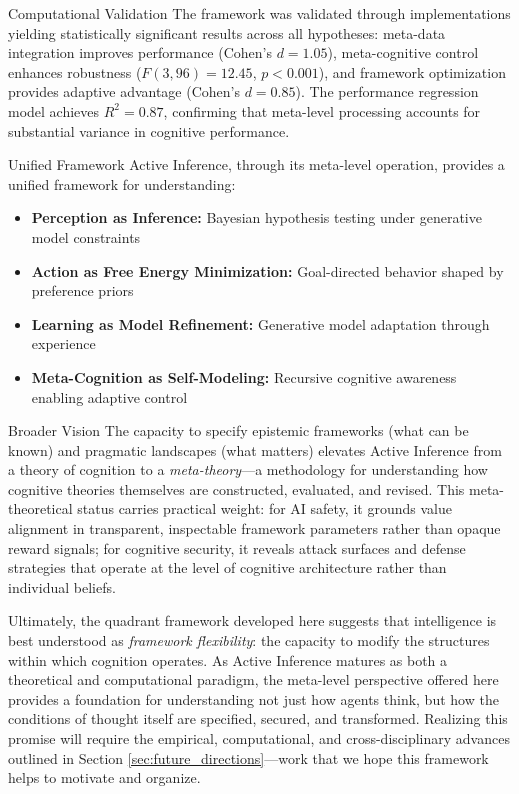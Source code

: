 \documentclass[
  ignorenonframetext,
]{beamer}
\providecommand{\tightlist}{%
  \setlength{\itemsep}{0pt}\setlength{\parskip}{0pt}}
\begin{document}
\begin{frame}{Computational Validation}
\protect{}\label{computational-validation}
The framework was validated through implementations yielding
statistically significant results across all hypotheses: meta-data
integration improves performance (Cohen's \(d = 1.05\)), meta-cognitive
control enhances robustness (\(F(3,96) = 12.45\), \(p < 0.001\)), and
framework optimization provides adaptive advantage (Cohen's
\(d = 0.85\)). The performance regression model achieves \(R^2 = 0.87\),
confirming that meta-level processing accounts for substantial variance
in cognitive performance.
\end{frame}

\begin{frame}{Unified Framework}
\protect{}\label{unified-framework}
Active Inference, through its meta-level operation, provides a unified
framework for understanding:

\begin{itemize}
\tightlist
\item
  \textbf{Perception as Inference:} Bayesian hypothesis testing under
  generative model constraints
\item
  \textbf{Action as Free Energy Minimization:} Goal-directed behavior
  shaped by preference priors
\item
  \textbf{Learning as Model Refinement:} Generative model adaptation
  through experience
\item
  \textbf{Meta-Cognition as Self-Modeling:} Recursive cognitive
  awareness enabling adaptive control
\end{itemize}
\end{frame}

\begin{frame}{Broader Vision}
\protect{}\label{broader-vision}
The capacity to specify epistemic frameworks (what can be known) and
pragmatic landscapes (what matters) elevates Active Inference from a
theory of cognition to a \emph{meta-theory}---a methodology for
understanding how cognitive theories themselves are constructed,
evaluated, and revised. This meta-theoretical status carries practical
weight: for AI safety, it grounds value alignment in transparent,
inspectable framework parameters rather than opaque reward signals; for
cognitive security, it reveals attack surfaces and defense strategies
that operate at the level of cognitive architecture rather than
individual beliefs.

Ultimately, the quadrant framework developed here suggests that
intelligence is best understood as \emph{framework flexibility}: the
capacity to modify the structures within which cognition operates. As
Active Inference matures as both a theoretical and computational
paradigm, the meta-level perspective offered here provides a foundation
for understanding not just how agents think, but how the conditions of
thought itself are specified, secured, and transformed. Realizing this
promise will require the empirical, computational, and
cross-disciplinary advances outlined in Section
\ref{sec:future_directions}---work that we hope this framework helps to
motivate and organize.
\end{frame}
\end{document}
